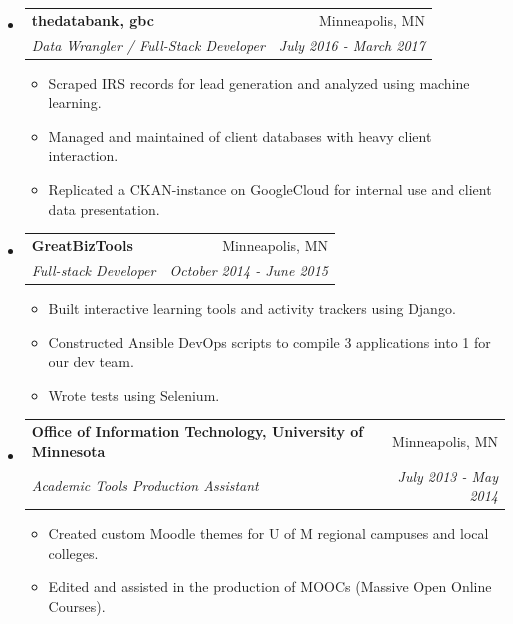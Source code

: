 \documentclass[letterpaper,11pt]{article}
\makeatletter
\newcommand{\resitem}[1]{\item #1 \vspace{-3pt}}
\newcommand{\ressubheading}[4]{
\begin{tabular*}{6.75in}{l@{\extracolsep{\fill}}r}
		\textbf{#1} & #2 \\
		\textit{#3} & \textit{#4} \\
\end{tabular*}\vspace{-6pt}}
\makeatother
\begin{document}
\begin{itemize}[label={}]




\item
	\ressubheading{thedatabank, gbc}{Minneapolis, MN}{Data Wrangler / Full-Stack Developer}{July 2016 - March 2017}
	\begin{itemize}[label={--}]
        \resitem{Scraped IRS records for lead generation and analyzed using machine learning.}
		\resitem{Managed and maintained  of client databases with heavy client interaction.}
		\resitem{Replicated a CKAN-instance on GoogleCloud for internal use and client data presentation.}\\
	\end{itemize}
\vspace{.25cm}

\item
	\ressubheading{GreatBizTools}{Minneapolis, MN}{Full-stack Developer}{October 2014 - June 2015}
	\begin{itemize}[label={--}]
		\resitem{Built interactive learning tools and activity trackers using Django.}
		\resitem{Constructed Ansible DevOps scripts to compile 3 applications into 1 for our dev team.}
		\resitem{Wrote tests using Selenium.}\\
	\end{itemize}
\vspace{.25cm}

\item
	\ressubheading{Office of Information Technology, University of Minnesota}{Minneapolis, MN}{Academic Tools Production Assistant}{July 2013 - May 2014}
	\begin{itemize}[label={--}]
		\resitem{Created custom Moodle themes for U of M regional campuses and local colleges.}
		\resitem{Edited and assisted in the production of MOOCs (Massive Open Online Courses).}
	\end{itemize}
\end{itemize}
\end{document}
